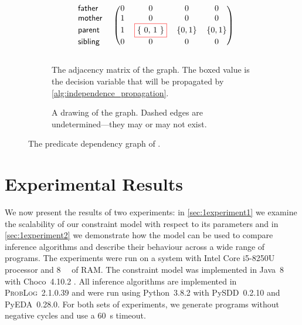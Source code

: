 \begin{figure}
  \begin{subfigure}[b]{0.59\textwidth}
    \centering
    \[
    \begin{blockarray}{lcccc}
      \begin{block}{l!{\quad}(cccc)}
        \mathsf{father} & 0 & 0 & 0 & 0 \\
        \mathsf{mother} & 1 & 0 & 0 & 0 \\
        \mathsf{parent} & 1 & \fbox{\{ 0, 1 \}} & \{ 0, 1 \} & \{ 0, 1 \} \\
        \mathsf{sibling} & 0 & 0 & 0 & 0 \\
      \end{block}
    \end{blockarray}
    \]
    \vspace{-1cm}
    \caption{The adjacency matrix of the graph. The boxed value is the decision
      variable that will be propagated by
      \cref{alg:independence_propagation}.}\label{fig:dependencies_matrix}
  \end{subfigure}%
  \hfill
  \begin{subfigure}[b]{.39\textwidth}
    \centering
    \caption{A drawing of the graph. Dashed edges are undetermined---they may or
      may not exist.}\label{fig:dependencies2}
  \end{subfigure}
  \caption{The predicate dependency graph of
    .}\label{fig:example}
\end{figure}

\section{Experimental Results}\label{sec:1experiments}

We now present the results of two experiments: in \cref{sec:1experiment1} we
examine the scalability of our constraint model with respect to its parameters
and in \cref{sec:1experiment2} we demonstrate how the model can be used to
compare inference algorithms and describe their behaviour across a wide range of
programs. The experiments were run on a system with Intel Core i5-8250U
processor and \SI{8}{\giga\byte} of RAM. The constraint model was implemented in
Java~8 with Choco~4.10.2 \citep{choco}. All inference algorithms are implemented
in \textsc{ProbLog}~2.1.0.39 and were run using Python~3.8.2 with PySDD~0.2.10
and PyEDA~0.28.0. For both sets of experiments, we generate programs without
negative cycles and use a \SI{60}{\second} timeout.

